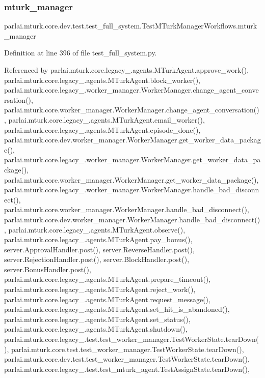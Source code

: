 \subsubsection{\texorpdfstring{mturk\+\_\+manager}{mturk\_manager}}
{\footnotesize\ttfamily parlai.\+mturk.\+core.\+dev.\+test.\+test\+\_\+full\+\_\+system.\+Test\+M\+Turk\+Manager\+Workflows.\+mturk\+\_\+manager}



Definition at line 396 of file test\+\_\+full\+\_\+system.\+py.



Referenced by parlai.\+mturk.\+core.\+legacy\+\_.\+agents.\+M\+Turk\+Agent.\+approve\+\_\+work(), parlai.\+mturk.\+core.\+legacy\+\_.\+agents.\+M\+Turk\+Agent.\+block\+\_\+worker(), parlai.\+mturk.\+core.\+legacy\+\_.\+worker\+\_\+manager.\+Worker\+Manager.\+change\+\_\+agent\+\_\+conversation(), parlai.\+mturk.\+core.\+worker\+\_\+manager.\+Worker\+Manager.\+change\+\_\+agent\+\_\+conversation(), parlai.\+mturk.\+core.\+legacy\+\_.\+agents.\+M\+Turk\+Agent.\+email\+\_\+worker(), parlai.\+mturk.\+core.\+legacy\+\_.\+agents.\+M\+Turk\+Agent.\+episode\+\_\+done(), parlai.\+mturk.\+core.\+dev.\+worker\+\_\+manager.\+Worker\+Manager.\+get\+\_\+worker\+\_\+data\+\_\+package(), parlai.\+mturk.\+core.\+legacy\+\_.\+worker\+\_\+manager.\+Worker\+Manager.\+get\+\_\+worker\+\_\+data\+\_\+package(), parlai.\+mturk.\+core.\+worker\+\_\+manager.\+Worker\+Manager.\+get\+\_\+worker\+\_\+data\+\_\+package(), parlai.\+mturk.\+core.\+legacy\+\_.\+worker\+\_\+manager.\+Worker\+Manager.\+handle\+\_\+bad\+\_\+disconnect(), parlai.\+mturk.\+core.\+worker\+\_\+manager.\+Worker\+Manager.\+handle\+\_\+bad\+\_\+disconnect(), parlai.\+mturk.\+core.\+dev.\+worker\+\_\+manager.\+Worker\+Manager.\+handle\+\_\+bad\+\_\+disconnect(), parlai.\+mturk.\+core.\+legacy\+\_.\+agents.\+M\+Turk\+Agent.\+observe(), parlai.\+mturk.\+core.\+legacy\+\_.\+agents.\+M\+Turk\+Agent.\+pay\+\_\+bonus(), server.\+Approval\+Handler.\+post(), server.\+Reverse\+Handler.\+post(), server.\+Rejection\+Handler.\+post(), server.\+Block\+Handler.\+post(), server.\+Bonus\+Handler.\+post(), parlai.\+mturk.\+core.\+legacy\+\_.\+agents.\+M\+Turk\+Agent.\+prepare\+\_\+timeout(), parlai.\+mturk.\+core.\+legacy\+\_.\+agents.\+M\+Turk\+Agent.\+reject\+\_\+work(), parlai.\+mturk.\+core.\+legacy\+\_.\+agents.\+M\+Turk\+Agent.\+request\+\_\+message(), parlai.\+mturk.\+core.\+legacy\+\_.\+agents.\+M\+Turk\+Agent.\+set\+\_\+hit\+\_\+is\+\_\+abandoned(), parlai.\+mturk.\+core.\+legacy\+\_.\+agents.\+M\+Turk\+Agent.\+set\+\_\+status(), parlai.\+mturk.\+core.\+legacy\+\_.\+agents.\+M\+Turk\+Agent.\+shutdown(), parlai.\+mturk.\+core.\+legacy\+\_.\+test.\+test\+\_\+worker\+\_\+manager.\+Test\+Worker\+State.\+tear\+Down(), parlai.\+mturk.\+core.\+test.\+test\+\_\+worker\+\_\+manager.\+Test\+Worker\+State.\+tear\+Down(), parlai.\+mturk.\+core.\+dev.\+test.\+test\+\_\+worker\+\_\+manager.\+Test\+Worker\+State.\+tear\+Down(), parlai.\+mturk.\+core.\+legacy\+\_.\+test.\+test\+\_\+mturk\+\_\+agent.\+Test\+Assign\+State.\+tear\+Down(), 